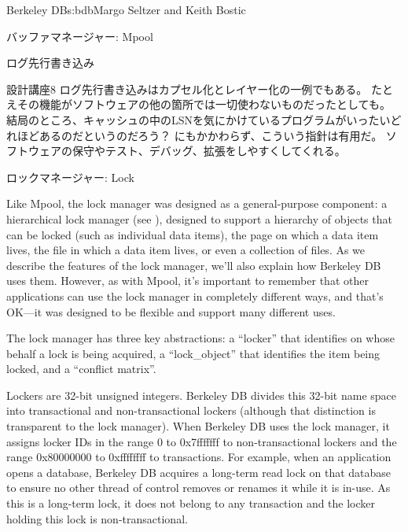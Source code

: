 \begin{aosachapter}{Berkeley DB}{s:bdb}{Margo Seltzer and Keith Bostic}
\begin{aosasect1}{バッファマネージャー: Mpool}
\begin{aosasect2}{ログ先行書き込み}
\begin{aosabox}{設計講座8}
ログ先行書き込みはカプセル化とレイヤー化の一例でもある。
たとえその機能がソフトウェアの他の箇所では一切使わないものだったとしても。
結局のところ、キャッシュの中のLSNを気にかけているプログラムがいったいどれほどあるのだというのだろう？
にもかかわらず、こういう指針は有用だ。
ソフトウェアの保守やテスト、デバッグ、拡張をしやすくしてくれる。

\end{aosabox}

\end{aosasect2}

\end{aosasect1}

\begin{aosasect1}{ロックマネージャー: Lock}


Like Mpool, the lock manager was designed as a general-purpose
component: a hierarchical lock manager (see \cite{bib:gray:lock}),
designed to support a hierarchy of objects that can be locked (such as
individual data items), the page on which a data item lives, the file
in which a data item lives, or even a collection of files. As we
describe the features of the lock manager, we'll also explain how
Berkeley DB uses them.  However, as with Mpool, it's important to
remember that other applications can use the lock manager in
completely different ways, and that's OK---it was designed to be
flexible and support many different uses.

The lock manager has three key abstractions: a ``locker'' that identifies
on whose behalf a lock is being acquired, a ``lock\_object'' that
identifies the item being locked, and a ``conflict matrix''.

Lockers are 32-bit unsigned integers. Berkeley DB divides this 32-bit
name space into transactional and non-transactional lockers (although
that distinction is transparent to the lock manager).  When Berkeley
DB uses the lock manager, it assigns locker IDs in the range 0 to
0x7fffffff to non-transactional lockers and the range 0x80000000 to
0xffffffff to transactions. For example, when an application opens a
database, Berkeley DB acquires a long-term read lock on that database
to ensure no other thread of control removes or renames it while it is
in-use. As this is a long-term lock, it does not belong to any
transaction and the locker holding this lock is non-transactional.


\end{aosasect1}
\end{aosachapter}
